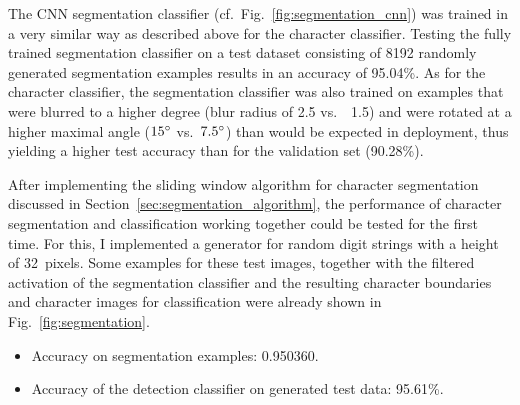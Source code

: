 \documentclass[11pt]{article}
\newcommand\figref[1]{Fig.~\ref{fig:#1}}
\newcommand\secref[1]{Section~\ref{sec:#1}}
\begin{document}
The CNN segmentation classifier (cf.~\figref{segmentation_cnn}) was trained in a very similar way as described above for the
character classifier. Testing the fully trained segmentation classifier on a test dataset consisting
of 8192 randomly generated segmentation examples results in an accuracy of 95.04\%.
As for the character classifier, the segmentation classifier was also trained on examples
that were blurred to a higher degree (blur radius of 2.5 vs.~ 1.5) and were rotated at a higher
maximal angle ($15\degree$ vs.~$7.5\degree$) than would be expected in deployment, thus
yielding a higher test accuracy than for the validation set (90.28\%).

After implementing the sliding window algorithm for character segmentation discussed in
\secref{segmentation_algorithm}, the performance of character segmentation and classification
working together could be tested for the first time. For this, I implemented a generator
for random digit strings with a height of 32~pixels. Some examples for these test images,
together with the filtered activation of the segmentation classifier and the resulting
character boundaries and character images for classification were already shown in
\figref{segmentation}.

  \begin{itemize}
    \item Accuracy on segmentation examples: 0.950360.
    \item Accuracy of the detection classifier on generated test data: 95.61\%.

  \end{itemize}
\end{document}
